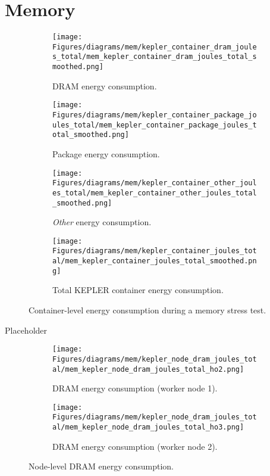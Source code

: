     


\section{Memory}

\begin{figure}[H]
    \centering
    \begin{subfigure}{0.49\textwidth}
        \texttt{[image: Figures/diagrams/mem/kepler\_container\_dram\_joules\_total/mem\_kepler\_container\_dram\_joules\_total\_smoothed.png]}
        \caption{DRAM energy consumption.}
    \end{subfigure}
    \begin{subfigure}{0.49\textwidth}
        \texttt{[image: Figures/diagrams/mem/kepler\_container\_package\_joules\_total/mem\_kepler\_container\_package\_joules\_total\_smoothed.png]}
        \caption{Package energy consumption.}
    \end{subfigure}
    \begin{subfigure}{0.49\textwidth}
        \texttt{[image: Figures/diagrams/mem/kepler\_container\_other\_joules\_total/mem\_kepler\_container\_other\_joules\_total\_smoothed.png]}
        \caption{\textit{Other} energy consumption.}
    \end{subfigure}
    \begin{subfigure}{0.49\textwidth}
        \texttt{[image: Figures/diagrams/mem/kepler\_container\_joules\_total/mem\_kepler\_container\_joules\_total\_smoothed.png]}
        \caption{Total KEPLER container energy consumption.}
    \end{subfigure}
    \caption{Container-level energy consumption during a memory stress test.}
\end{figure}

Placeholder

\begin{figure}[H]
    \centering
    \begin{subfigure}{0.49\textwidth}
        \texttt{[image: Figures/diagrams/mem/kepler\_node\_dram\_joules\_total/mem\_kepler\_node\_dram\_joules\_total\_ho2.png]}
        \caption{DRAM energy consumption (worker node 1).}
    \end{subfigure}
    \begin{subfigure}{0.49\textwidth}
        \texttt{[image: Figures/diagrams/mem/kepler\_node\_dram\_joules\_total/mem\_kepler\_node\_dram\_joules\_total\_ho3.png]}
        \caption{DRAM energy consumption (worker node 2).}
    \end{subfigure}
    \caption{Node-level DRAM energy consumption.}
\end{figure}

